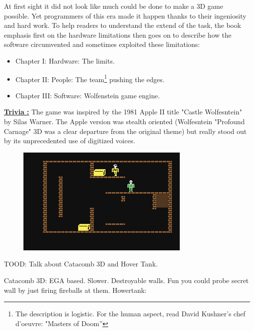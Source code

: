 At first sight it did not look like much could be done to make a 3D game possible. Yet programmers of this era made it happen thanks to their ingeniosity and hard work. To help readers to understand the extend of the task, the book emphasis first on the hardware limitations then goes on to describe how the software circumvented and sometimes exploited these limitations:
\begin{itemize}
\item Chapter I: Hardware: The limits.
\item Chapter II: People: The team\footnote{The description is logistic. For the human aspect, read David Kushner's chef d'oeuvre: "Masters of Doom''} pushing the edges.
\item Chapter III: Software: Wolfenstein game engine.
\end{itemize}
\par
\textbf{\underline{Trivia :}} The game was inspired by the 1981 Apple II title "Castle Wolfesntein" by Silas Warner. The Apple version was stealth oriented (Wolfesntein "Profound Carnage" 3D was a clear departure from the original theme) but really stood out by its unprecedented use of digitized voices.

 \begin{figure}[H]
\centering
      \includegraphics[width=\textwidth]{imgs/CastleWolfensteinC64.png}
\end{figure}

TOOD: Talk about Catacomb 3D and Hover Tank.

Catacomb 3D: EGA based. Slower. Destroyable walls. Fun you could probe secret wall by just firing fireballs at them.
Howertank: 